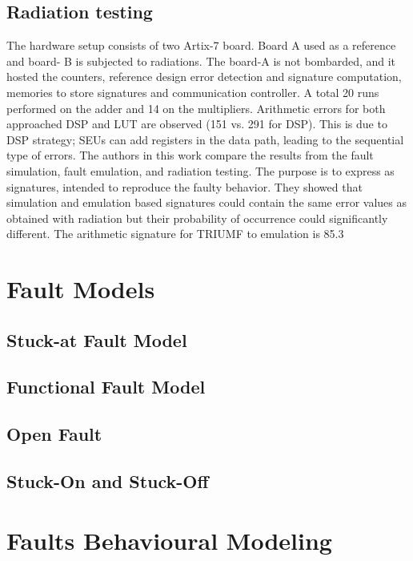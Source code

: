 \subsection{Radiation testing}
The hardware setup consists of two Artix-7 board. Board A used as a reference and board- B is subjected to radiations. The board-A is not bombarded, and it hosted the counters, reference design error detection and signature computation, memories to store signatures and communication controller. A total 20 runs performed on the adder and 14 on the multipliers. Arithmetic errors for both approached DSP and LUT are observed (151 vs. 291 for DSP). This is due to DSP strategy; SEUs can add registers in the data path, leading to the sequential type of errors. The authors in this work compare the results from the fault simulation, fault emulation, and radiation testing. The purpose is to express as signatures, intended to reproduce the faulty behavior. They showed that simulation and emulation based signatures could contain the same error values as obtained with radiation but their probability of occurrence could significantly different. The arithmetic signature for TRIUMF to emulation is 85.3 %


\section{Fault Models}
\subsection{Stuck-at Fault Model}
\subsection{Functional Fault Model}
\subsection{Open Fault}
\subsection{Stuck-On and Stuck-Off}


\section{Faults Behavioural Modeling}



